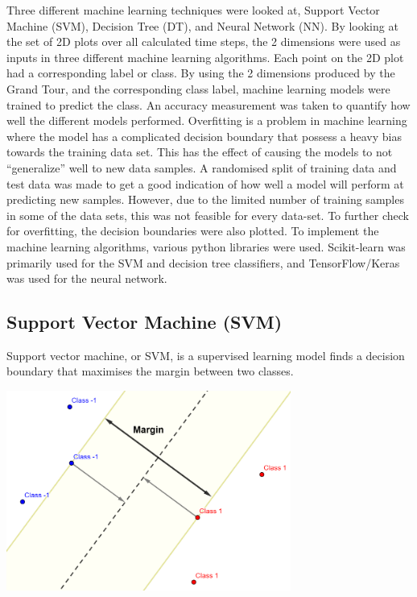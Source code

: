 \documentclass[a4paper,11pt,twoside]{article}
\begin{document}
Three different machine learning techniques were looked at, Support Vector Machine (SVM), Decision Tree (DT), and Neural Network (NN). By looking at the set of 2D plots over all calculated time steps, the 2 dimensions were used as inputs in three different machine learning algorithms. Each point on the 2D plot had a corresponding label or class. By using the 2 dimensions produced by the Grand Tour, and the corresponding class label, machine learning models were trained to predict the class. An accuracy measurement was taken to quantify how well the different models performed. 
\newline
\newline
Overfitting is a problem in machine learning where the model has a complicated decision boundary that possess a heavy bias towards the training data set\cite{Hawkins2004}. This has the effect of causing the models to not “generalize” well to new data samples. A randomised split of training data and test data was made to get a good indication of how well a model will perform at predicting new samples. However, due to the limited number of training samples in some of the data sets, this was not feasible for every data-set. To further check for overfitting, the decision boundaries were also plotted.
\newline
\newline
To implement the machine learning algorithms, various python libraries were used. Scikit-learn was primarily used for the SVM and decision tree classifiers, and TensorFlow/Keras was used for the neural network.

\newpage
\subsection{Support Vector Machine (SVM)}

Support vector machine, or SVM, is a supervised learning model finds a decision boundary that maximises the margin between two classes. 

\begin{center}
\includegraphics[width=0.7\textwidth]{SVM.png}

\end{center}
\end{document}
